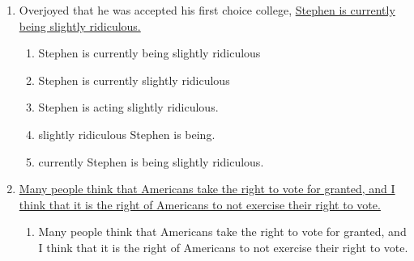 \begin{enumerate}
\begin{spacing}{1.5}
\begin{enumerate}[label=(\Alph*)]
\item arrived in the theater and donned a red dress.

\hrulefill

\item arrived in the theater wearing a red dress.

\hrulefill

\item arrived at the theater donning a red dress.

\hrulefill
\end{enumerate}
\end{spacing}

\bigskip
\item Overjoyed that he was accepted his first choice college, \ul{Stephen is currently being slightly ridiculous.}

\begin{spacing}{1.5}
\begin{enumerate}[label=(\Alph*)]
\item Stephen is currently being slightly ridiculous

\hrulefill

\item Stephen is currently slightly ridiculous

\hrulefill

\item Stephen is acting slightly ridiculous.

\hrulefill

\item slightly ridiculous Stephen is being.

\hrulefill

\item currently Stephen is being slightly ridiculous.

\hrulefill
\end{enumerate}
\end{spacing}

\bigskip
\item \ul{Many people think that Americans take the right to vote for granted, and I think that it is the right of Americans to not exercise their right to vote.}

\begin{spacing}{1.5}
\begin{enumerate}[label=(\Alph*)]
\item Many people think that Americans take the right to vote for granted, and I think that it is the right of Americans to not exercise their right to vote.


\end{enumerate}
\end{spacing}
\end{enumerate}
